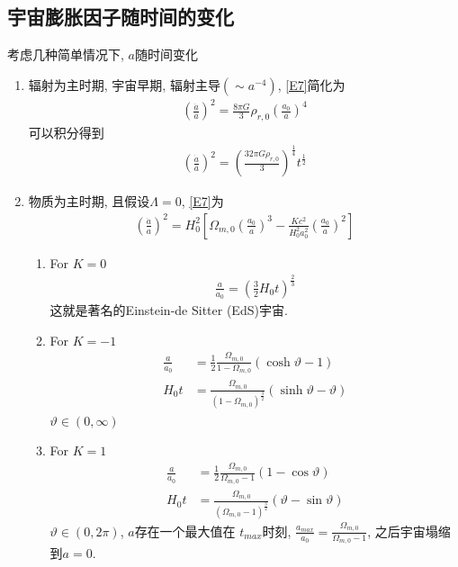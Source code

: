 \subsection{宇宙膨胀因子随时间的变化}
考虑几种简单情况下, $a$随时间变化
\begin{enumerate}
    \item 辐射为主时期, 宇宙早期, 辐射主导$(\sim a^{-4})$, \ref{E7}简化为
    \begin{align*}
        \left( \frac{\dot{a}}{a} \right)^2=\frac{8\pi G}{3}\rho_{r,0}\left( \frac{a_0}{a} \right)^4
    \end{align*}
    可以积分得到
    \begin{align}
        \left( \frac{\dot{a}}{a} \right)^2=\left( \frac{32\pi G \rho_{r,0}}{3} \right)^{\frac{1}{4}}t^{\frac{1}{2}}\label{E12}
    \end{align}
    \item 物质为主时期, 且假设$\Lambda=0$, \ref{E7}为
    \begin{align*}
        \left( \frac{\dot{a}}{a} \right)^2=H_0^2\left[ \Omega_{m, 0}\left( \frac{a_0}{a} \right) ^3 - \frac{K c^2}{H_0^2a_0^2}\left( \frac{a_0}{a} \right)^2\right]
    \end{align*}
    \begin{enumerate}
        \item For $K=0$
        \begin{align*}
            \frac{a}{a_0}=\left( \frac{3}{2}H_0 t \right)^{\frac{2}{3}}
        \end{align*}
        这就是著名的Einstein-de Sitter (EdS)宇宙. 
        \item For $K=-1$
        \begin{align*}
            \frac{a}{a_0}&=\frac{1}{2}\frac{\Omega_{m, 0}}{1-\Omega_{m, 0}}(\cosh \vartheta -1)\\
            H_0 t&=\frac{\Omega_{m, 0}}{(1-\Omega_{m, 0})^{\frac{3}{2}}}(\sinh \vartheta-\vartheta)
        \end{align*}
        $\vartheta\in (0, \infty)$
        \item For $K=1$
        \begin{align*}
            \frac{a}{a_0}&=\frac{1}{2}\frac{\Omega_{m, 0}}{\Omega_{m, 0}-1}(1-\cos \vartheta)\\
            H_0 t&=\frac{\Omega_{m, 0}}{(\Omega_{m, 0}-1)^{\frac{3}{2}}}( \vartheta-\sin\vartheta)
        \end{align*}
        $\vartheta\in (0, 2\pi)$, $a$存在一个最大值在 $t_{max}$时刻, $\frac{a_{max}}{a_0}=\frac{\Omega_{m, 0}}{\Omega_{m, 0}-1}$, 之后宇宙塌缩到$a=0$. 

\end{enumerate}
\end{enumerate}
